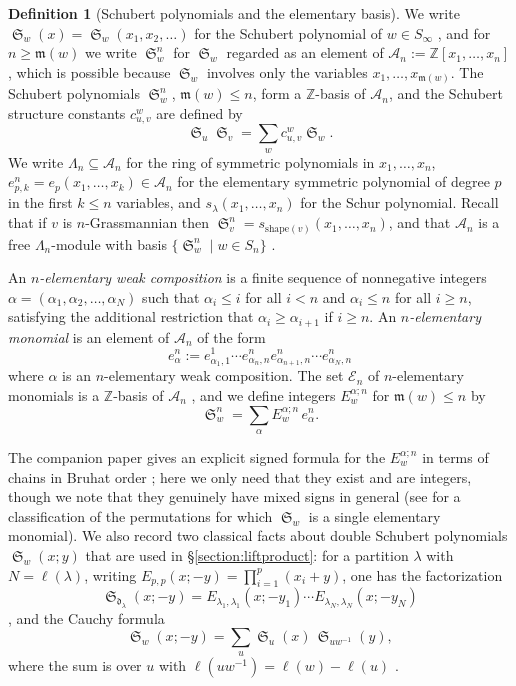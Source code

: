 \documentclass{amsart}
\theoremstyle{definition}
\newtheorem{definition}[lemma]{Definition}
\theoremstyle{remark}
\numberwithin{equation}{subsection}
\DeclareMathOperator{\sch}{\mathfrak{S}}
\newcommand{\coma}{\mathcal{A}}
\newcommand{\dom}{\mathfrak{d}}
\newcommand{\maxd}{\mathfrak{m}}
\begin{document}
\begin{definition}[Schubert polynomials and the elementary basis]\label{definition:schubert}
We write $\sch_w(x)=\sch_w(x_1,x_2,\ldots)$ for the Schubert polynomial of $w\in S_\infty$ \cite{notes}, and for $n\geq\maxd(w)$ we write $\sch_w^n$ for $\sch_w$ regarded as an element of $\coma_n := \mathbb{Z}[x_1,\ldots,x_n]$, which is possible because $\sch_w$ involves only the variables $x_1,\ldots,x_{\maxd(w)}$. The Schubert polynomials $\sch_w^n$, $\maxd(w)\leq n$, form a $\mathbb{Z}$-basis of $\coma_n$, and the Schubert structure constants $c_{u,v}^w$ are defined by
$$\sch_u\sch_v = \sum_w c_{u,v}^w\sch_w.$$
We write $\Lambda_n\subseteq\coma_n$ for the ring of symmetric polynomials in $x_1,\ldots,x_n$, $e_{p,k}^n=e_p(x_1,\ldots,x_k)\in\coma_n$ for the elementary symmetric polynomial of degree $p$ in the first $k\leq n$ variables, and $s_\lambda(x_1,\ldots,x_n)$ for the Schur polynomial. Recall that if $v$ is $n$-Grassmannian then $\sch_v^n = s_{\mathrm{shape}(v)}(x_1,\ldots,x_n)$, and that $\coma_n$ is a free $\Lambda_n$-module with basis $\{\sch_w^n\mid w\in S_n\}$ \cite{notes}.

An \emph{$n$-elementary weak composition} is a finite sequence of nonnegative integers $\alpha=(\alpha_1,\alpha_2,\ldots,\alpha_N)$ such that $\alpha_i\leq i$ for all $i<n$ and $\alpha_i\leq n$  for all $i\geq n$, satisfying the additional restriction that $\alpha_i\geq \alpha_{i+1}$ if $i\geq n$. An \emph{$n$-elementary monomial} is an element of $\coma_n$ of the form 
$$e_\alpha^n := e_{\alpha_1,1}^{1}\cdots e_{\alpha_n,n}^ne_{\alpha_{n+1},n}^n\cdots e_{\alpha_N,n}^n$$
where $\alpha$ is an $n$-elementary weak composition. The set $\mathcal{E}_n$ of $n$-elementary monomials is a $\mathbb{Z}$-basis of $\coma_n$ \cite[\S\ref*{B-section:elementary}]{samuelbialgebra}, and we define integers $E_w^{\alpha;n}$ for $\maxd(w)\leq n$ by
$$\sch_w^n = \sum_\alpha E_w^{\alpha;n}\,e_\alpha^n.$$
\end{definition}

The companion paper gives an explicit signed formula for the $E_w^{\alpha;n}$ in terms of chains in Bruhat order \cite[Theorem~\ref*{B-theorem:elemtrans}]{samuelbialgebra}; here we only need that they exist and are integers, though we note that they genuinely have mixed signs in general (see \cite{woodruff2025single} for a classification of the permutations for which $\sch_w$ is a single elementary monomial). We also record two classical facts about double Schubert polynomials $\sch_w(x;y)$ that are used in \S\ref{section:liftproduct}: for a partition $\lambda$ with $N=\ell(\lambda)$, writing $E_{p,p}(x;-y)=\prod_{i=1}^p(x_i+y)$, one has the factorization
$$\sch_{\dom_\lambda}(x;-y) = E_{\lambda_1,\lambda_1}(x;-y_1)\cdots E_{\lambda_N,\lambda_N}(x;-y_N)$$
\cite[(6.14)]{notes}, and the Cauchy formula
$$\sch_w(x;-y) = \sum_{u} \sch_u(x)\,\sch_{uw^{-1}}(y),$$
where the sum is over $u$ with $\ell(uw^{-1})=\ell(w)-\ell(u)$ \cite{notes}.
\end{document}
